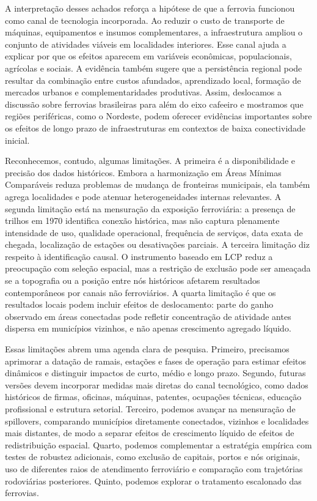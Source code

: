 \documentclass[12pt,a4paper]{article}
\begin{document}
A interpretação desses achados reforça a hipótese de que a ferrovia funcionou como canal de tecnologia incorporada. Ao reduzir o custo de transporte de máquinas, equipamentos e insumos complementares, a infraestrutura ampliou o conjunto de atividades viáveis em localidades interiores. Esse canal ajuda a explicar por que os efeitos aparecem em variáveis econômicas, populacionais, agrícolas e sociais. A evidência também sugere que a persistência regional pode resultar da combinação entre custos afundados, aprendizado local, formação de mercados urbanos e complementaridades produtivas. Assim, deslocamos a discussão sobre ferrovias brasileiras para além do eixo cafeeiro e mostramos que regiões periféricas, como o Nordeste, podem oferecer evidências importantes sobre os efeitos de longo prazo de infraestruturas em contextos de baixa conectividade inicial.

Reconhecemos, contudo, algumas limitações. A primeira é a disponibilidade e precisão dos dados históricos. Embora a harmonização em Áreas Mínimas Comparáveis reduza problemas de mudança de fronteiras municipais, ela também agrega localidades e pode atenuar heterogeneidades internas relevantes. A segunda limitação está na mensuração da exposição ferroviária: a presença de trilhos em 1970 identifica conexão histórica, mas não captura plenamente intensidade de uso, qualidade operacional, frequência de serviços, data exata de chegada, localização de estações ou desativações parciais. A terceira limitação diz respeito à identificação causal. O instrumento baseado em LCP reduz a preocupação com seleção espacial, mas a restrição de exclusão pode ser ameaçada se a topografia ou a posição entre nós históricos afetarem resultados contemporâneos por canais não ferroviários. A quarta limitação é que os resultados locais podem incluir efeitos de deslocamento: parte do ganho observado em áreas conectadas pode refletir concentração de atividade antes dispersa em municípios vizinhos, e não apenas crescimento agregado líquido.

Essas limitações abrem uma agenda clara de pesquisa. Primeiro, precisamos aprimorar a datação de ramais, estações e fases de operação para estimar efeitos dinâmicos e distinguir impactos de curto, médio e longo prazo. Segundo, futuras versões devem incorporar medidas mais diretas do canal tecnológico, como dados históricos de firmas, oficinas, máquinas, patentes, ocupações técnicas, educação profissional e estrutura setorial. Terceiro, podemos avançar na mensuração de spillovers, comparando municípios diretamente conectados, vizinhos e localidades mais distantes, de modo a separar efeitos de crescimento líquido de efeitos de redistribuição espacial. Quarto, podemos complementar a estratégia empírica com testes de robustez adicionais, como exclusão de capitais, portos e nós originais, uso de diferentes raios de atendimento ferroviário e comparação com trajetórias rodoviárias posteriores. Quinto, podemos explorar o tratamento escalonado das ferrovias.
\end{document}
